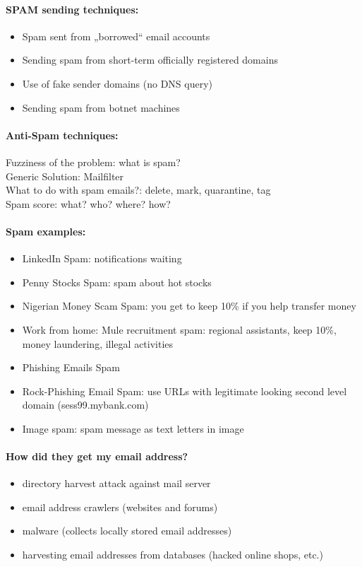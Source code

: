 \paragraph{SPAM sending techniques:}
\begin{itemize}
\item Spam sent from „borrowed“ email accounts
\item Sending spam from short-term officially registered domains
\item Use of fake sender domains (no DNS query) 
\item Sending spam from botnet machines
\end{itemize}

\paragraph{Anti-Spam techniques:} Fuzziness of the problem: what is spam? \\
Generic Solution: Mailfilter\\
What to do with spam emails?: delete, mark, quarantine, tag\\
Spam score: what? who? where? how?

\paragraph{Spam examples:}
\begin{itemize}
\item LinkedIn Spam: notifications waiting
\item Penny Stocks Spam: spam about hot stocks
\item Nigerian Money Scam Spam: you get to keep 10\% if you help transfer money
\item Work from home: Mule recruitment spam: regional assistants, keep 10\%, money laundering, illegal activities
\item Phishing Emails Spam
\item Rock-Phishing Email Spam: use URLs with legitimate looking second level domain (sess99.mybank.com)
\item Image spam: spam message as text letters in image
\end{itemize}

\paragraph{How did they get my email address?}
\begin{itemize}
\item directory harvest attack against mail server
\item email address crawlers (websites and forums)
\item malware (collects locally stored email addresses)
\item harvesting email addresses from databases (hacked online shops, etc.)
\end{itemize}

